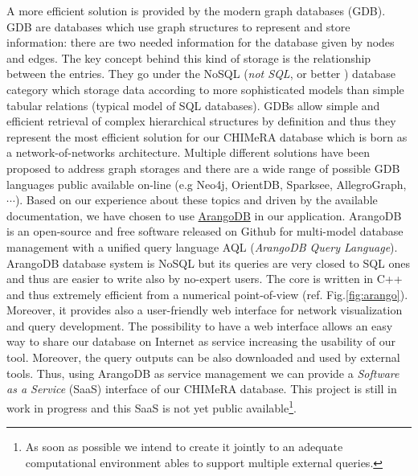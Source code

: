 \documentclass{standalone}
\begin{document}
A more efficient solution is provided by the modern graph databases (GDB).
GDB are databases which use graph structures to represent and store information: there are two needed information for the database given by nodes and edges.
The key concept behind this kind of storage is the relationship between the entries.
They go under the \textsf{NoSQL} (\emph{not SQL}, or better ) database category which storage data according to more sophisticated models than simple tabular relations (typical model of \textsf{SQL} databases).
GDBs allow simple and efficient retrieval of complex hierarchical structures by definition and thus they represent the most efficient solution for our \textsf{CHIMeRA} database which is born as a network-of-networks architecture.
Multiple different solutions have been proposed to address graph storages and there are a wide range of possible GDB languages public available on-line (e.g \textsf{Neo4j}, \textsf{OrientDB}, \textsf{Sparksee}, \textsf{AllegroGraph}, $\cdots$).
Based on our experience about these topics and driven by the available documentation, we have chosen to use \href{https://www.arangodb.com/}{\textsf{ArangoDB}} in our application.
\textsf{ArangoDB} is an open-source and free software released on Github for multi-model database management with a unified query language \textsf{AQL} (\emph{ArangoDB Query Language}).
\textsf{ArangoDB} database system is \textsf{NoSQL} but its queries are very closed to \textsf{SQL} ones and thus are easier to write also by no-expert users.
The core is written in \textsf{C++} and thus extremely efficient from a numerical point-of-view (ref. Fig.\ref{fig:arango}).
Moreover, it provides also a user-friendly web interface for network visualization and query development.
The possibility to have a web interface allows an easy way to share our database on Internet as service increasing the usability of our tool.
Moreover, the query outputs can be also downloaded and used by external tools.
Thus, using \textsf{ArangoDB} as service management we can provide a \emph{Software as a Service} (SaaS) interface of our \textsf{CHIMeRA} database.
This project is still in work in progress and this SaaS is not yet public available\footnote{
  As soon as possible we intend to create it jointly to an adequate computational environment ables to support multiple external queries.
}.
\end{document}
